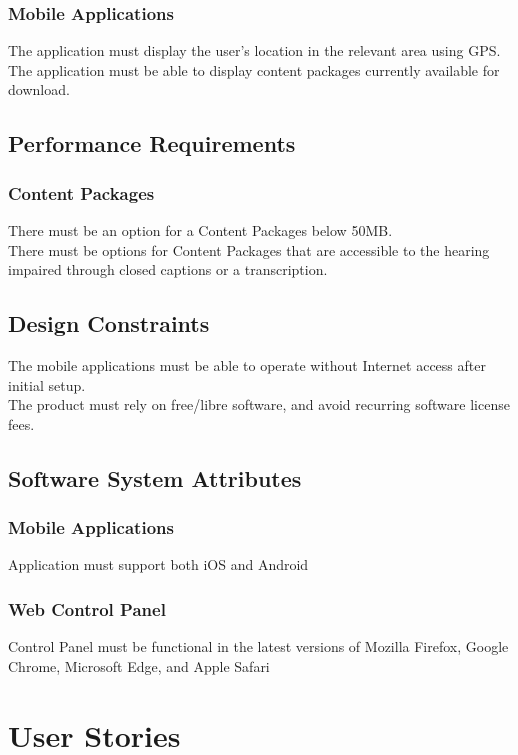 \documentclass[letterpaper, 10pt,titlepage]{article}
\begin{document}
\subsubsection{Mobile Applications}
The application must display the user's location in the relevant area using GPS.\\
The application must be able to display content packages currently available for download.

\subsection{Performance Requirements}
\subsubsection{Content Packages}
There must be an option for a Content Packages below 50MB.\\
There must be options for Content Packages that are accessible to the hearing impaired through closed captions or a transcription.

\subsection{Design Constraints}
The mobile applications must be able to operate without Internet access after initial setup.\\
The product must rely on free/libre software, and avoid recurring software license fees.

\subsection{Software System Attributes}
\subsubsection{Mobile Applications}
Application must support both iOS and Android
\subsubsection{Web Control Panel}
Control Panel must be functional in the latest versions of Mozilla Firefox, Google Chrome, Microsoft Edge, and Apple Safari
\vspace{0.5cm}


\section{User Stories}
\end{document}
